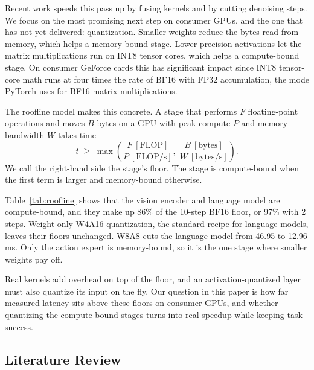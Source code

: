 \documentclass[12pt,letterpaper]{article}
\begin{document}
Recent work speeds this pass up by fusing kernels and by cutting denoising steps. We focus on the most promising next step on consumer GPUs, and the one that has not yet delivered: quantization. Smaller weights reduce the bytes read from memory, which helps a memory-bound stage. Lower-precision activations let the matrix multiplications run on INT8 tensor cores, which helps a compute-bound stage. On consumer GeForce cards this has significant impact since INT8 tensor-core math runs at four times the rate of BF16 with FP32 accumulation, the mode PyTorch uses for BF16 matrix multiplications.

The roofline model \citep{williams2009roofline} makes this concrete. A stage that performs $F$ floating-point operations and moves $B$ bytes on a GPU with peak compute $P$ and memory bandwidth $W$ takes time
\[
t \;\ge\; \max\!\left(\frac{F\ [\text{FLOP}]}{P\ [\text{FLOP/s}]},\; \frac{B\ [\text{bytes}]}{W\ [\text{bytes/s}]}\right).
\]
We call the right-hand side the stage's floor. The stage is compute-bound when the first term is larger and memory-bound otherwise.

\begin{table}[htbp]

\caption{Floor in ms for $\pi_{0.5}$ on an RTX 3090 Ti using the model shapes from the openpi implementation \citep{openpi2025}, for 3 image slots (2 camera views + 1 unused) and a prompt padded to 200 tokens. C marks a compute-bound stage and M a memory-bound one. Produced by \texttt{uv run python -m piquant.roofline}.}
\label{tab:roofline}
\end{table}

Table~\ref{tab:roofline} shows that the vision encoder and language model are compute-bound, and they make up 86\% of the 10-step BF16 floor, or 97\% with 2 steps. Weight-only W4A16 quantization, the standard recipe for language models, leaves their floors unchanged. W8A8 cuts the language model from 46.95 to 12.96 ms. Only the action expert is memory-bound, so it is the one stage where smaller weights pay off.

Real kernels add overhead on top of the floor, and an activation-quantized layer must also quantize its input on the fly. Our question in this paper is how far measured latency sits above these floors on consumer GPUs, and whether quantizing the compute-bound stages turns into real speedup while keeping task success.

\subsection{Literature Review}
\end{document}
